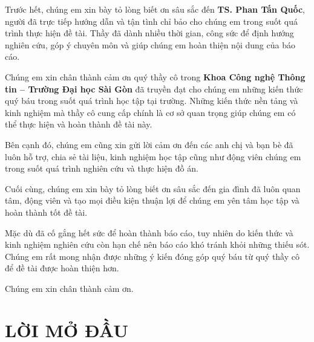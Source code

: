 \documentclass[14pt, a4paper]{report}
\begin{document}
Trước hết, chúng em xin bày tỏ lòng biết ơn sâu sắc đến \textbf{TS. Phan Tấn Quốc}, người đã trực tiếp hướng dẫn và tận tình chỉ bảo cho chúng em trong suốt quá trình thực hiện đề tài. Thầy đã dành nhiều thời gian, công sức để định hướng nghiên cứu, góp ý chuyên môn và giúp chúng em hoàn thiện nội dung của báo cáo.

Chúng em xin chân thành cảm ơn quý thầy cô trong \textbf{Khoa Công nghệ Thông tin -- Trường Đại học Sài Gòn} đã truyền đạt cho chúng em những kiến thức quý báu trong suốt quá trình học tập tại trường. Những kiến thức nền tảng và kinh nghiệm mà thầy cô cung cấp chính là cơ sở quan trọng giúp chúng em có thể thực hiện và hoàn thành đề tài này.

Bên cạnh đó, chúng em cũng xin gửi lời cảm ơn đến các anh chị và bạn bè đã luôn hỗ trợ, chia sẻ tài liệu, kinh nghiệm học tập cũng như động viên chúng em trong suốt quá trình nghiên cứu và thực hiện đồ án.

Cuối cùng, chúng em xin bày tỏ lòng biết ơn sâu sắc đến gia đình đã luôn quan tâm, động viên và tạo mọi điều kiện thuận lợi để chúng em yên tâm học tập và hoàn thành tốt đề tài.

Mặc dù đã cố gắng hết sức để hoàn thành báo cáo, tuy nhiên do kiến thức và kinh nghiệm nghiên cứu còn hạn chế nên báo cáo khó tránh khỏi những thiếu sót. Chúng em rất mong nhận được những ý kiến đóng góp quý báu từ quý thầy cô để đề tài được hoàn thiện hơn.

Chúng em xin chân thành cảm ơn.

\newpage

\tableofcontents


\mainmatter
{}
\pagestyle{mainstyle}

\chapter*{LỜI MỞ ĐẦU}

\renewcommand{\thesection}{\arabic{section}.}
\renewcommand{\thesubsection}{\arabic{section}.\arabic{subsection}.}
\renewcommand{\thesubsubsection}{\arabic{section}.\arabic{subsection}.\arabic{subsubsection}.}
\end{document}
